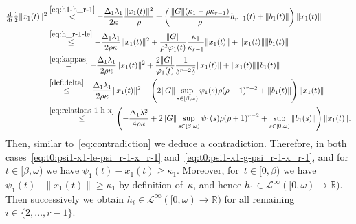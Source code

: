 \documentclass[ envcountsect, envcountsame]{svjour3}
\newcommand{\ddt}{\tfrac{\text{\normalfont d}}{\text{\normalfont d}t}}
\newcommand{\R}{\mathbb{R}}
\newcommand{\cL}{\mathcal{L}}
\newcommand{\vp}{\varphi}
\begin{document}
\begin{equation*}
\begin{aligned}
\ddt \tfrac{1}{2} \|x_1(t)\|^2 
& \overset{\eqref{eq:h1-h_r-1}}{<}  -\frac{\Delta_1 \lambda_1}{2 \kappa} \frac{\|x_1(t)\|^2}{\rho} + \left(\frac{\|G\| (\kappa_1 - \rho  \kappa_{r-1})}{\rho} h_{r-1}(t)  
+  \|b_1(t)\| \right) \|x_1(t)\| \\
& \overset{\eqref{eq:h_r-1-le}}{\le}  -\frac{\Delta_1  \lambda_1}{2 \rho \kappa}\|x_1(t)\|^2
+ \frac{ \|G\| }{\rho^2 \vp_1(t)  } \frac{\kappa_1}{\kappa_{r-1}} \|x_1(t)\| + \|x_1(t)\| \|b_1(t)\| \\
& \overset{\eqref{eq:kappas}}{=} -\frac{\Delta_1  \lambda_1}{2 \rho \kappa} \|x_1(t)\|^2
+ \frac{2 \|G\| }{ \vp_1(t)} \frac{1}{ \delta^{r-2} \hat \delta} \|x_1(t)\| + \|x_1(t)\| \|b_1(t)\| \\
& \overset{\eqref{def:delta}}{\le} -\frac{\Delta_1  \lambda_1}{2 \rho \kappa} \|x_1(t)\|^2 
+ \left( 2 \|G\| \sup_{s \in [\beta,\omega)} \psi_1(s) \rho (\rho+1)^{r-2} +  \|b_1(t)\| \right)\|x_1(t)\| \\
& \overset{\eqref{eq:relations-1-h-x}}{\le} 
\left( - \frac{\Delta_1 \lambda_1^2}{4 \rho \kappa} + 2 \|G\| \sup_{s \in [\beta,\omega)} \psi_1(s) \rho (\rho+1)^{r-2} + \sup_{s \in [0,\omega)} \|b_1(s)\| \right) \|x_1(t)\| .
\end{aligned}
\end{equation*}
Then, similar to~\eqref{eq:contradiction} we deduce a contradiction.
%
%
Therefore, in both cases~\eqref{eq:t0:psi1-x1-le-psi_r-1-x_r-1} and~\eqref{eq:t0:psi1-x1-g-psi_r-1-x_r-1}, and for $t \in [\beta, \omega)$ we have $\psi_1(t) - x_1(t) \ge \kappa_1$. 
Moreover, for~$t \in [0,\beta)$ we have $\psi_1(t) - \|x_1(t)\| \ge \kappa_1$ by definition of~$ \kappa$, and hence $h_1 \in \cL^{\infty}([0,\omega) \to \R)$.
Then successively we obtain $h_i \in \cL^\infty([0,\omega) \to \R)$ for all remaining $i \in \{2,\ldots,r-1\}$.
\end{document}
